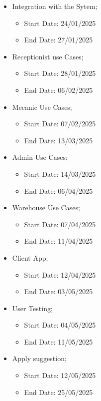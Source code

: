\begin{itemize}
  \item Integration with the Sytem;
  \begin{itemize}
      \item Start Date: 24/01/2025 
      \item End Date: 27/01/2025 
  \end{itemize}
    \item Receptionist use Cases;
    \begin{itemize}
        \item Start Date: 28/01/2025 
        \item End Date: 06/02/2025 
    \end{itemize}
    \item Mecanic Use Cases;
    \begin{itemize}
      \item Start Date: 07/02/2025 
      \item End Date: 13/03/2025 
  \end{itemize}
    \item Admin Use Cases;
    \begin{itemize}
      \item Start Date: 14/03/2025 
      \item End Date: 06/04/2025 
  \end{itemize}
    \item Warehouse Use Cases;
    \begin{itemize}
      \item Start Date: 07/04/2025 
      \item End Date: 11/04/2025 
  \end{itemize}
    \item Client App;
    \begin{itemize}
      \item Start Date: 12/04/2025 
      \item End Date: 03/05/2025 
  \end{itemize}
  \item User Testing;
  \begin{itemize}
    \item Start Date: 04/05/2025 
    \item End Date: 11/05/2025 
\end{itemize}
  \item Apply suggestion;
  \begin{itemize}
    \item Start Date: 12/05/2025 
    \item End Date: 25/05/2025 
\end{itemize}
  \end{itemize}

